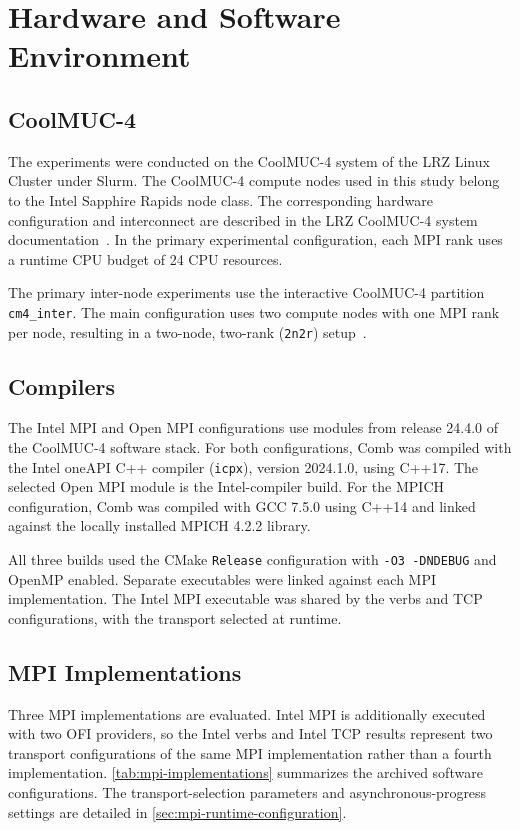 \section{Hardware and Software Environment}

\subsection{CoolMUC-4}

The experiments were conducted on the CoolMUC-4 system of the LRZ Linux Cluster under Slurm. The CoolMUC-4 compute nodes used in this study belong to the Intel Sapphire Rapids node class. The corresponding hardware configuration and interconnect are described in the LRZ CoolMUC-4 system documentation~\cite{lrzCoolMUC4}. In the primary experimental configuration, each MPI rank uses a runtime CPU budget of 24 CPU resources.

The primary inter-node experiments use the interactive CoolMUC-4 partition \texttt{cm4\_inter}. The main configuration uses two compute nodes with one MPI rank per node, resulting in a two-node, two-rank (\texttt{2n2r}) setup~\cite{lrzCm4Inter}.

\subsection{Compilers}

The Intel MPI and Open MPI configurations use modules from release
24.4.0 of the CoolMUC-4 software stack. For both configurations,
Comb was compiled with the Intel oneAPI C++ compiler
(\texttt{icpx}), version 2024.1.0, using C++17. The selected
Open MPI module is the Intel-compiler build. For the MPICH
configuration, Comb was compiled with GCC 7.5.0 using C++14
and linked against the locally installed MPICH 4.2.2 library.

All three builds used the CMake \texttt{Release} configuration
with \texttt{-O3 -DNDEBUG} and OpenMP enabled. Separate executables
were linked against each MPI implementation. The Intel MPI
executable was shared by the verbs and TCP configurations,
with the transport selected at runtime.

\subsection{MPI Implementations}

Three MPI implementations are evaluated. Intel MPI is additionally executed
with two OFI providers, so the Intel verbs and Intel TCP results represent two
transport configurations of the same MPI implementation rather than a fourth
implementation. \autoref{tab:mpi-implementations} summarizes the archived
software configurations. The transport-selection parameters and
asynchronous-progress settings are detailed in
\autoref{sec:mpi-runtime-configuration}.

